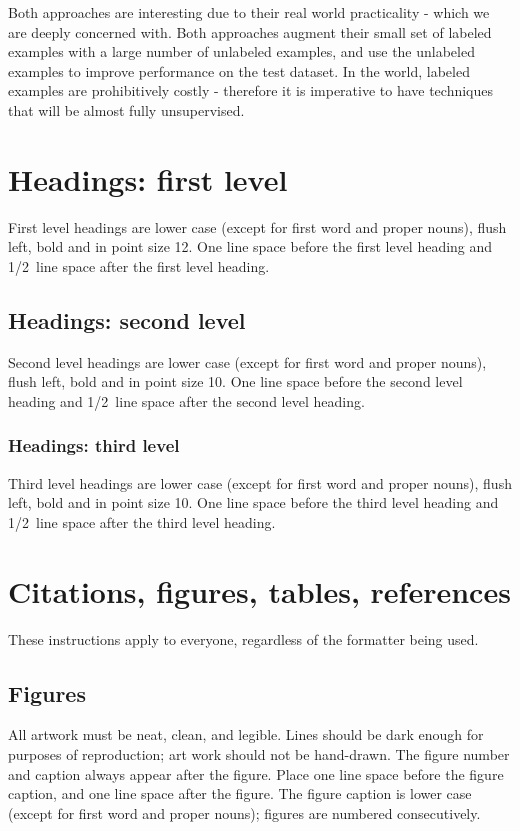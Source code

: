 \documentclass{article} %
\begin{document}
Both approaches are interesting due to their real world practicality - which we are deeply
concerned with. Both approaches augment their small set of labeled examples with a large 
number of unlabeled examples, and use the unlabeled examples to improve performance on the
test dataset. In the world, labeled examples are prohibitively costly -
therefore it is imperative to have techniques that will be almost fully unsupervised. 

\section{Headings: first level}
\label{headings}

First level headings are lower case (except for first word and proper nouns),
flush left, bold and in point size 12. One line space before the first level
heading and 1/2~line space after the first level heading.

\subsection{Headings: second level}

Second level headings are lower case (except for first word and proper nouns),
flush left, bold and in point size 10. One line space before the second level
heading and 1/2~line space after the second level heading.

\subsubsection{Headings: third level}

Third level headings are lower case (except for first word and proper nouns),
flush left, bold and in point size 10. One line space before the third level
heading and 1/2~line space after the third level heading.

\section{Citations, figures, tables, references}
\label{others}

These instructions apply to everyone, regardless of the formatter being used.

\subsection{Figures}

All artwork must be neat, clean, and legible. Lines should be dark
enough for purposes of reproduction; art work should not be
hand-drawn. The figure number and caption always appear after the
figure. Place one line space before the figure caption, and one line
space after the figure. The figure caption is lower case (except for
first word and proper nouns); figures are numbered consecutively.
\end{document}
